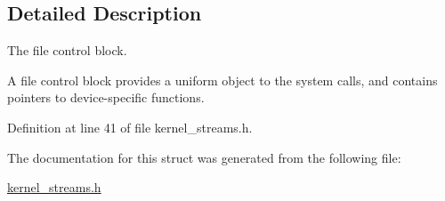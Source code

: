 \subsection{Detailed Description}
The file control block. 

A file control block provides a uniform object to the system calls, and contains pointers to device-\/specific functions. 

Definition at line 41 of file kernel\-\_\-streams.\-h.



The documentation for this struct was generated from the following file\-:\begin{DoxyCompactItemize}
\item 
\hyperlink{kernel__streams_8h}{kernel\-\_\-streams.\-h}\end{DoxyCompactItemize}
